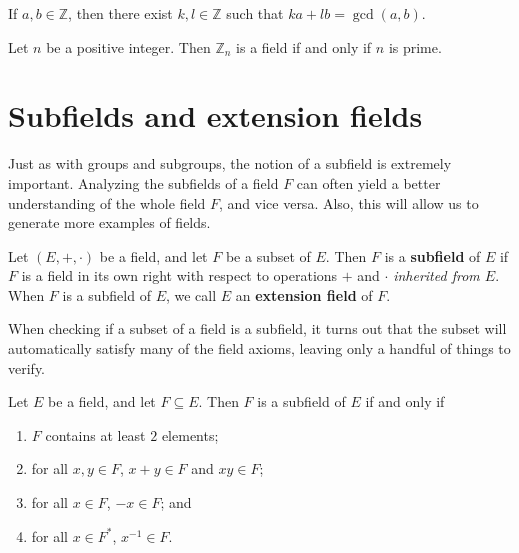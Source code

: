 \begin{fact}\label{Fact.Bezout}
If $a,b\in \mathbb{Z}$, then there exist $k,l\in \mathbb{Z}$ such that $ka+lb = \gcd(a,b)$.
\end{fact}

\begin{theorem}\label{thm.ZpField}
Let $n$ be a positive integer. Then $\mathbb{Z}_n$ is a field if and only if $n$ is prime.
\end{theorem}

\section{Subfields and extension fields}

Just as with groups and subgroups, the notion of a subfield is extremely important. Analyzing the subfields of a field $F$ can often yield a better understanding of the whole field $F$, and vice versa. Also, this will allow us to generate  more examples of fields.

\begin{definition}
Let $(E,+,\cdot)$ be a field, and let $F$ be a subset of $E$. Then $F$ is a \textbf{subfield} of $E$ if $F$ is a field in its own right with respect to operations $+$ and $\cdot$ \emph{inherited from $E$}. When $F$ is a subfield of $E$, we call $E$  an \textbf{extension field} of $F$.
\end{definition}

When checking if a subset of a field is a subfield, it turns out that the subset will automatically satisfy many of the field axioms, leaving only a handful of things to verify.

\begin{theorem}
Let $E$ be a field, and let $F\subseteq E$. Then $F$ is a subfield of $E$ if and only if 
\begin{enumerate}
\item $F$ contains at least $2$ elements;
\item for all $x,y\in F$, $x+y\in F$ and  $xy\in F$;
\item for all $x\in F$, $-x\in F$; and 
\item for all $x\in F^*$, $x^{-1}\in F$.
\end{enumerate}
\end{theorem}


